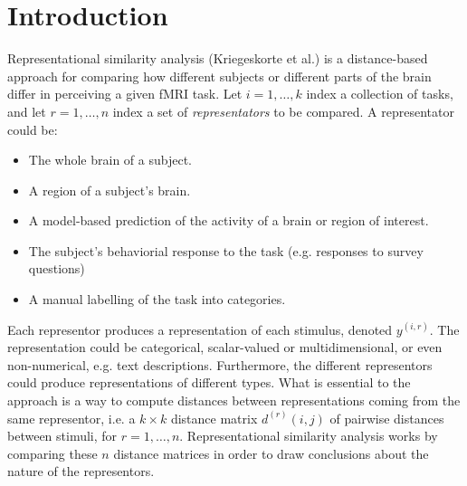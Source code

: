 \documentclass[12pt]{article}
\begin{document}
\maketitle

\newcommand{\tr}{\text{tr}}
\newcommand{\E}{\textbf{E}}
\newcommand{\diag}{\text{diag}}
\newcommand{\argmax}{\text{argmax}}
\newcommand{\Cov}{\text{Cov}}
\newcommand{\Var}{\text{Var}}
\newcommand{\argmin}{\text{argmin}}
\newcommand{\Vol}{\text{Vol}}
\newcommand{\comm}[1]{}

\newcommand{\bx}{\boldsymbol{x}}
\newcommand{\by}{\boldsymbol{y}}
\newcommand{\bX}{\boldsymbol{X}}
\newcommand{\bY}{\boldsymbol{Y}}


\section{Introduction}

Representational similarity analysis (Kriegeskorte et al.) is a distance-based approach
for comparing how different subjects or different parts of the brain
differ in perceiving a given fMRI task.
Let $i = 1,\hdots, k$ index a collection of tasks,
and let $r = 1,\hdots, n$ index a set of \emph{representators} to be compared.
A representator could be:
\begin{itemize}
\item The whole brain of a subject.
\item A region of a subject's brain.
\item A model-based prediction of the activity of a brain or region of interest.
\item The subject's behaviorial response to the task (e.g. responses to survey questions)
\item A manual labelling of the task into categories.
\end{itemize}

Each representor produces a representation of each stimulus, denoted $y^{(i, r)}$.
The representation could be categorical, scalar-valued or multidimensional,
or even non-numerical, e.g. text descriptions.
Furthermore, the different representors could produce representations of different types.
What is essential to the approach is a way to compute distances between representations coming
from the same representor, i.e. a $k \times k$ distance matrix
$d^{(r)}(i, j)$ of pairwise distances between stimuli, for $r = 1,\hdots, n$.
Representational similarity analysis works by comparing these $n$ distance matrices
in order to draw conclusions about the nature of the representors.
\end{document}
